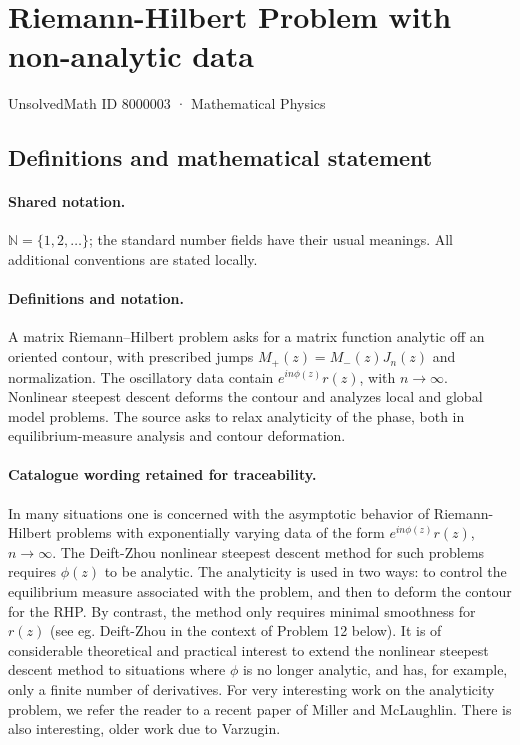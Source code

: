 \documentclass[11pt]{article}
\begin{document}
\setcounter{section}{8000002}
\section{Riemann-Hilbert Problem with non-analytic data}\label{8000003}
{\small UnsolvedMath ID 8000003 · Mathematical Physics}
\subsection{Definitions and mathematical statement}

\paragraph{Shared notation.}$\mathbb N=\{1,2,\ldots\}$; the standard number fields have their usual meanings. All additional conventions are stated locally.


\paragraph{Definitions and notation.}A matrix Riemann--Hilbert problem asks for a matrix function analytic off an oriented contour, with prescribed jumps $M_+(z)=M_-(z)J_n(z)$ and normalization. The oscillatory data contain $e^{in\phi(z)}r(z)$, with $n\to\infty$. Nonlinear steepest descent deforms the contour and analyzes local and global model problems. The source asks to relax analyticity of the phase, both in equilibrium-measure analysis and contour deformation.

\paragraph{Catalogue wording retained for traceability.}
In many situations one is concerned with the asymptotic behavior of Riemann-Hilbert problems with exponentially varying data of the form $e^{in\phi(z)} r(z)$, $n \to \infty$. The Deift-Zhou nonlinear steepest descent method for such problems requires $\phi(z)$ to be analytic. The analyticity is used in two ways: to control the equilibrium measure associated with the problem, and then to deform the contour for the RHP. By contrast, the method only requires minimal smoothness for $r(z)$ (see eg. Deift-Zhou in the context of Problem 12 below). It is of considerable theoretical and practical interest to extend the nonlinear steepest descent method to situations where $\phi$ is no longer analytic, and has, for example, only a finite number of derivatives. For very interesting work on the analyticity problem, we refer the reader to a recent paper of Miller and McLaughlin. There is also interesting, older work due to Varzugin.
\end{document}
